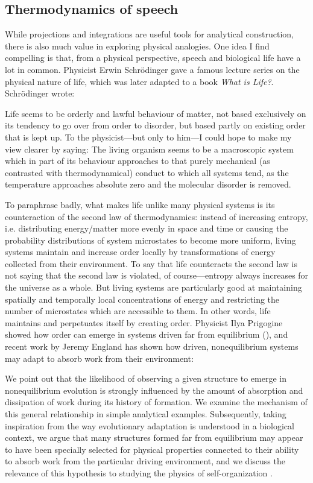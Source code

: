 \subsection{Thermodynamics of speech}

While projections and integrations are useful tools for analytical construction, there is also much value in exploring physical analogies. One idea I find compelling is that, from a physical perspective, speech and biological life have a lot in common. Physicist Erwin Schrödinger gave a famous lecture series on the physical nature of life, which was later adapted to a book \textit{What is Life?}. Schrödinger wrote:

Life seems to be orderly and lawful behaviour of matter, not based exclusively on its tendency to go over from order to disorder, but based partly on existing order that is kept up. To the physicist—but only to him—I could hope to make my view clearer by saying: The living organism seems to be a macroscopic system which in part of its behaviour approaches to that purely mechanical (as contrasted with thermodynamical) conduct to which all systems tend, as the temperature approaches absolute zero and the molecular disorder is removed. \citep{Schrödinger1944}

  To paraphrase badly, what makes life unlike many physical systems is its counteraction of the second law of thermodynamics: instead of increasing entropy, i.e. distributing energy/matter more evenly in space and time or causing the probability distributions of system microstates to become more uniform, living systems maintain and increase order locally by transformations of energy collected from their environment. To say that life counteracts the second law is not saying that the second law is violated, of course—entropy always increases for the universe as a whole. But living systems are particularly good at maintaining spatially and temporally local concentrations of energy and restricting the number of microstates which are accessible to them. In other words, life maintains and perpetuates itself by creating order. Physicist Ilya Prigogine showed how order can emerge in systems driven far from equilibrium (\citealt{KondepudiPrigogine1998,NicolisPrigogine1977,PrigogineStengers1984}), and recent work by Jeremy England has shown how driven, nonequilibrium systems may adapt to absorb work from their environment:

We point out that the likelihood of observing a given structure to emerge in nonequilibrium evolution is strongly influenced by the amount of absorption and dissipation of work during its history of formation. We examine the mechanism of this general relationship in simple analytical examples. Subsequently, taking inspiration from the way evolutionary adaptation is understood in a biological context, we argue that many structures formed far from equilibrium may appear to have been specially selected for physical properties connected to their ability to absorb work from the particular driving environment, and we discuss the relevance of this hypothesis to studying the physics of self-organization \citep{PerunovEtAl2016}.

